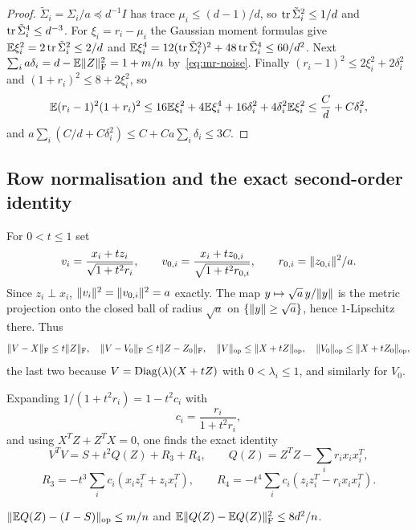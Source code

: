\begin{proof}
$\tilde\Sigma_i=\Sigma_i/a\preceq d^{-1}I$ has trace $\mu_i\le(d-1)/d$, so
$\operatorname{tr}\tilde\Sigma_i^2\le1/d$ and $\operatorname{tr}\tilde\Sigma_i^4\le d^{-3}$. For
$\xi_i=r_i-\mu_i$ the Gaussian moment formulas give $\mathbb E\xi_i^2=2\operatorname{tr}\tilde\Sigma_i^2\le
2/d$ and $\mathbb E\xi_i^4=12(\operatorname{tr}\tilde\Sigma_i^2)^2+48\operatorname{tr}\tilde\Sigma_i^4\le60/d^2$.
Next $\sum_ia\delta_i=d-\mathbb E\lVert Z\rVert_{\mathrm F}^2=1+m/n$ by~\eqref{eq:mr-noise}. Finally
$(r_i-1)^2\le2\xi_i^2+2\delta_i^2$ and $(1+r_i)^2\le8+2\xi_i^2$, so
\[
 \mathbb E(r_i-1)^2(1+r_i)^2\le16\mathbb E\xi_i^2+4\mathbb E\xi_i^4+16\delta_i^2+4\delta_i^2\mathbb E\xi_i^2
 \le\frac{C}d+C\delta_i^2 ,
\]
and $a\sum_i(C/d+C\delta_i^2)\le C+Ca\sum_i\delta_i\le3C$.
\end{proof}

\subsection{Row normalisation and the exact second-order identity}

For $0<t\le1$ set
\[
 v_i=\frac{x_i+tz_i}{\sqrt{1+t^2r_i}},\qquad
 v_{0,i}=\frac{x_i+tz_{0,i}}{\sqrt{1+t^2r_{0,i}}},\qquad
 r_{0,i}=\lVert z_{0,i}\rVert^2/a .
\]
Since $z_i\perp x_i$, $\lVert v_i\rVert^2=\lVert v_{0,i}\rVert^2=a$ exactly. The map
$y\mapsto\sqrt a\,y/\lVert y\rVert$ is the metric projection onto the closed ball of
radius $\sqrt a$ on $\{\lVert y\rVert\ge\sqrt a\}$, hence $1$-Lipschitz there. Thus
\begin{equation}\label{eq:mr-contract}
 \lVert V-X\rVert_{\mathrm F}\le t\lVert Z\rVert_{\mathrm F},\quad \lVert V-V_0\rVert_{\mathrm F}\le t\lVert Z-Z_0\rVert_{\mathrm F},\quad
 \lVert V\rVert_{\mathrm{op}}\le\lVert X+tZ\rVert_{\mathrm{op}},\quad\lVert V_0\rVert_{\mathrm{op}}\le\lVert X+tZ_0\rVert_{\mathrm{op}},
\end{equation}
the last two because $V=\operatorname{Diag}(\lambda)(X+tZ)$ with $0<\lambda_i\le1$, and similarly
for $V_0$.

Expanding $1/(1+t^2r_i)=1-t^2c_i$ with
\[
 c_i=\frac{r_i}{1+t^2r_i},
\]
and using $X^TZ+Z^TX=0$, one finds the exact identity
\begin{equation}\label{eq:mr-identity}
 V^TV=S+t^2Q(Z)+R_3+R_4,\qquad Q(Z)=Z^TZ-\sum_ir_ix_ix_i^T,
\end{equation}
\[
 R_3=-t^3\sum_ic_i(x_iz_i^T+z_ix_i^T),\qquad
 R_4=-t^4\sum_ic_i(z_iz_i^T-r_ix_ix_i^T).
\]

\begin{lemma}\label{lem:Q}
$\lVert \mathbb E Q(Z)-(I-S)\rVert_{\mathrm{op}}\le m/n$ and $\mathbb E\lVert Q(Z)-\mathbb E Q(Z)\rVert_{\mathrm F}^2\le8d^2/n$.
\end{lemma}

